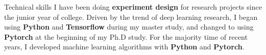 \documentclass{resume} %
\begin{document}
\vspace{-0.1cm}
\begin{rSection}{Technical skills}
I have been doing \textbf{experiment design} for research projects since the junior year of college.  Driven by the trend of deep learning research, I began using \textbf{Python} and \textbf{Tensorflow} during my master study, and changed to using \textbf{Pytorch} at the beginning of my Ph.D study.  For the majority time of recent years, I developed machine learning algorithms with \textbf{Python} and \textbf{Pytorch}. 

 

\end{rSection}
\end{document}
